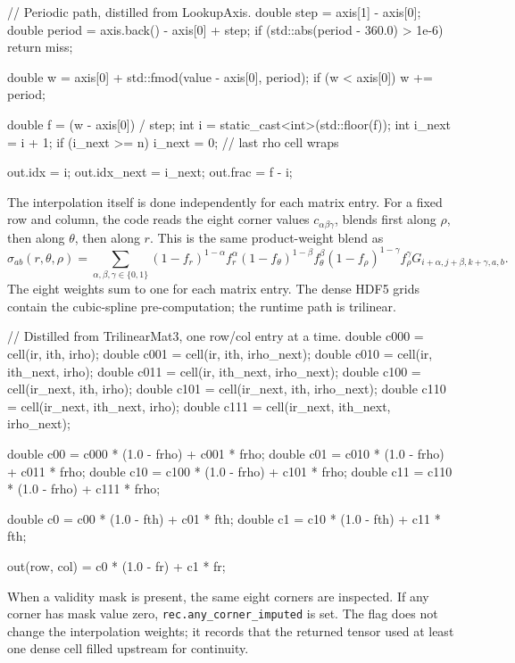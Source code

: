 \documentclass[11pt]{article}
\newcommand{\code}[1]{\texttt{#1}}
\begin{document}
\begin{codebox}
// Periodic path, distilled from LookupAxis.
double step   = axis[1] - axis[0];
double period = axis.back() - axis[0] + step;
if (std::abs(period - 360.0) > 1e-6) return miss;

double w = axis[0] + std::fmod(value - axis[0], period);
if (w < axis[0]) w += period;

double f = (w - axis[0]) / step;
int i = static_cast<int>(std::floor(f));
int i_next = i + 1;
if (i_next >= n) i_next = 0;       // last rho cell wraps

out.idx      = i;
out.idx_next = i_next;
out.frac     = f - i;
\end{codebox}

The interpolation itself is done independently for each matrix entry. For a
fixed row and column, the code reads the eight corner values
\(c_{\alpha\beta\gamma}\), blends first along \(\rho\), then along
\(\theta\), then along \(r\). This is the same product-weight blend as
\[
  \sigma_{ab}(r,\theta,\rho) =
  \sum_{\alpha,\beta,\gamma\in\{0,1\}}
  (1-f_r)^{1-\alpha} f_r^\alpha
  (1-f_\theta)^{1-\beta} f_\theta^\beta
  (1-f_\rho)^{1-\gamma} f_\rho^\gamma
  G_{i+\alpha,j+\beta,k+\gamma,a,b}.
\]
The eight weights sum to one for each matrix entry. The dense HDF5 grids
contain the cubic-spline pre-computation; the runtime path is trilinear.

\begin{codebox}
// Distilled from TrilinearMat3, one row/col entry at a time.
double c000 = cell(ir,      ith,      irho);
double c001 = cell(ir,      ith,      irho_next);
double c010 = cell(ir,      ith_next, irho);
double c011 = cell(ir,      ith_next, irho_next);
double c100 = cell(ir_next, ith,      irho);
double c101 = cell(ir_next, ith,      irho_next);
double c110 = cell(ir_next, ith_next, irho);
double c111 = cell(ir_next, ith_next, irho_next);

double c00 = c000 * (1.0 - frho) + c001 * frho;
double c01 = c010 * (1.0 - frho) + c011 * frho;
double c10 = c100 * (1.0 - frho) + c101 * frho;
double c11 = c110 * (1.0 - frho) + c111 * frho;

double c0 = c00 * (1.0 - fth) + c01 * fth;
double c1 = c10 * (1.0 - fth) + c11 * fth;

out(row, col) = c0 * (1.0 - fr) + c1 * fr;
\end{codebox}

When a validity mask is present, the same eight corners are inspected. If any
corner has mask value zero, \code{rec.any\_corner\_imputed} is set. The flag
does not change the interpolation weights; it records that the returned tensor
used at least one dense cell filled upstream for continuity.
\end{document}
